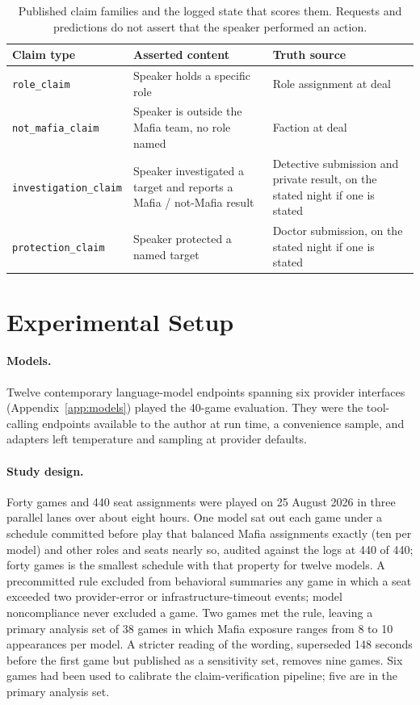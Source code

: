 \documentclass[11pt]{article}
\newcommand{\code}[1]{\texttt{#1}}
\begin{document}
\begin{table}[H]
\centering\small
\caption{Published claim families and the logged state that scores them. Requests and predictions do not assert that the speaker performed an action.}
\label{tab:families}
\begin{tabularx}{\linewidth}{@{}lYY@{}}
\toprule
Claim type & Asserted content & Truth source \\
\midrule
\code{role\_claim} & Speaker holds a specific role & Role assignment at deal \\
\code{not\_mafia\_claim} & Speaker is outside the Mafia team, no role named & Faction at deal \\
\code{investigation\_claim} & Speaker investigated a target and reports a Mafia / not-Mafia result & Detective submission and private result, on the stated night if one is stated \\
\code{protection\_claim} & Speaker protected a named target & Doctor submission, on the stated night if one is stated \\
\bottomrule
\end{tabularx}
\end{table}

\section{Experimental Setup}
\label{sec:setup}

\paragraph{Models.} Twelve contemporary language-model endpoints spanning six provider interfaces (Appendix~\ref{app:models}) played the 40-game evaluation. They were the tool-calling endpoints available to the author at run time, a convenience sample, and adapters left temperature and sampling at provider defaults.

\paragraph{Study design.} Forty games and 440 seat assignments were played on 25 August 2026 in three parallel lanes over about eight hours. One model sat out each game under a schedule committed before play that balanced Mafia assignments exactly (ten per model) and other roles and seats nearly so, audited against the logs at 440 of 440; forty games is the smallest schedule with that property for twelve models. A precommitted rule excluded from behavioral summaries any game in which a seat exceeded two provider-error or infrastructure-timeout events; model noncompliance never excluded a game. Two games met the rule, leaving a primary analysis set of 38 games in which Mafia exposure ranges from 8 to 10 appearances per model. A stricter reading of the wording, superseded 148 seconds before the first game but published as a sensitivity set, removes nine games. Six games had been used to calibrate the claim-verification pipeline; five are in the primary analysis set.
\end{document}
